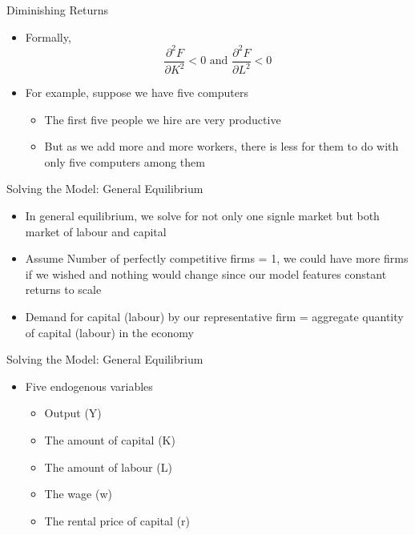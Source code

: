 \documentclass[aspectratio=1610]{beamer}
\begin{document}
\begin{frame}[wide]{Diminishing Returns}
	\begin{itemize}
		\item Formally, 
		\[\frac{\partial^2 F  }{\partial K^2}<0 \text{ and } \frac{\partial^2 F }{\partial L^2} <0\]		
		\item For example, suppose we have five computers
		\begin{itemize}
			\item  The first five people we hire are very productive
			\item But as we add more and more workers, there is less for them to do with only five computers among them
		\end{itemize}
	\end{itemize}
\end{frame}

\begin{frame}[wide]{Solving the Model: General Equilibrium}
	\begin{itemize}
		\item In general equilibrium, we solve for not only one signle market but both market of labour and capital
		\item Assume Number of perfectly competitive firms = 1, we could have more firms if we wished and nothing would change since our model features constant returns to scale
		\item Demand for capital (labour) by our representative firm = aggregate quantity of capital  (labour) in the economy		
	\end{itemize}
\end{frame}

\begin{frame}[wide]{Solving the Model: General Equilibrium}
	\begin{itemize}
		\item Five endogenous variables
		\begin{itemize}
			\item Output (Y)
			\item The amount of capital (K)
			\item The amount of labour (L)
			\item The wage (w)
			\item The rental price of capital (r)
		\end{itemize}
	\end{itemize}
\end{frame}
\end{document}
